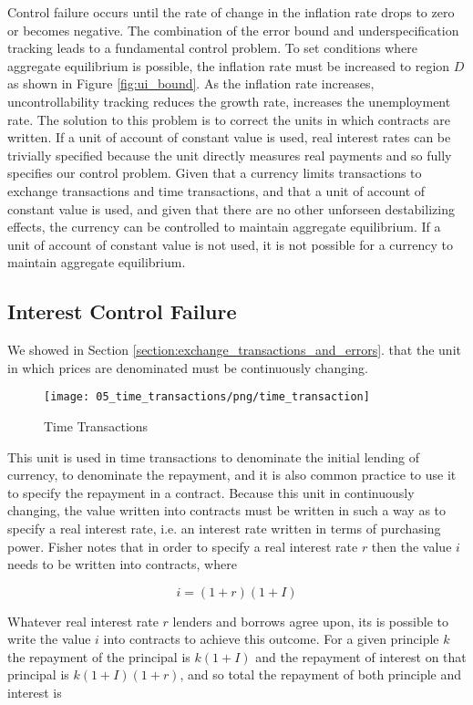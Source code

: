 Control failure occurs until the rate of change in the inflation rate drops to zero or becomes
negative. The combination of the error bound and underspecification tracking leads to a fundamental
control problem. To set conditions where aggregate equilibrium is possible, the inflation rate must
be increased to region $D$ as shown in Figure \ref{fig:ui_bound}. As the inflation rate increases,
uncontrollability tracking reduces the growth rate, increases the unemployment rate. The solution to
this problem is to correct the units in which contracts are written. If a unit of account of
constant value is used, real interest rates can be trivially specified because the unit directly
measures real payments and so fully specifies our control problem. Given that a currency limits
transactions to exchange transactions and time transactions, and that a unit of account of constant
value is used, and given that there are no other unforseen destabilizing effects, the currency can
be controlled to maintain aggregate equilibrium. If a unit of account of constant value is not used,
it is not possible for a currency to maintain aggregate equilibrium.

\subsection{Interest Control Failure}

We showed in Section \ref{section:exchange_transactions_and_errors}. that the unit in which prices are
denominated must be continuously changing.

\begin{figure}[H]
\centering
\texttt{[image: 05\_time\_transactions/png/time\_transaction]}
\caption{Time Transactions}
\label{fig:time_transaction_contracts}
\end{figure}

This unit is used in time transactions to denominate the initial lending of currency, to denominate
the repayment, and it is also common practice to use it to specify the repayment in a contract.
Because this unit in continuously changing, the value written into contracts must be written in such
a way as to specify a real interest rate, i.e. an interest rate written in terms of purchasing
power. Fisher \cite{fisher1907} notes that in order to specify a real interest rate $r$ then the
value $i$ needs to be written into contracts, where

\[
    i = (1+r)(1+I)
\]

Whatever real interest rate $r$ lenders and borrows agree upon, its is possible to write the value
$i$ into contracts to achieve this outcome. For a given principle $k$ the repayment of the principal
is $k(1+I)$ and the repayment of interest on that principal is $k(1+I)(1+r)$, and so total the
repayment of both principle and interest is

